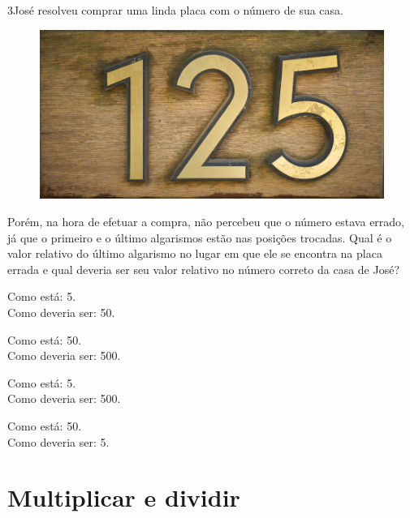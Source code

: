 \pagebreak
\num{3}José resolveu comprar uma linda placa com o número de sua casa.

\begin{figure}[htpb!]
\centering
\includegraphics[width=.5\textwidth]{./imgs/mat1.png}
\end{figure}

Porém, na hora de efetuar a compra, não percebeu que o número estava
errado, já que o primeiro e o último algarismos estão nas posições
trocadas. Qual é o valor relativo do último algarismo no lugar em que ele se
encontra na placa errada e qual deveria ser seu valor relativo no número
correto da casa de José?\bigskip

\begin{minipage}{.5\textwidth}
\begin{escolha}
\item
  Como está: 5.\\
  Como deveria ser: 50.
\item
  Como está: 50.\\
  Como deveria ser: 500.
\item
  Como está: 5.\\
  Como deveria ser: 500.
\item
  Como está: 50.\\
  Como deveria ser: 5.
\end{escolha}
\end{minipage}


\chapter{Multiplicar e dividir}

